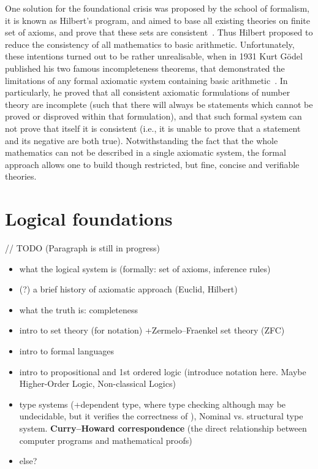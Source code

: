 \documentclass[article]{aaltoseries}
\begin{document}
One solution for the foundational crisis was proposed by the school of formalism, it is known as Hilbert's program, and aimed to base all existing theories on finite set of axioms, and prove that these sets are consistent~\cite{Zac06}. Thus Hilbert proposed to reduce the consistency of all mathematics to basic arithmetic. 
Unfortunately, these intentions turned out to be rather unrealisable, when in 1931 Kurt Gödel published his two famous incompleteness theorems, that demonstrated the limitations of any formal axiomatic system containing basic arithmetic~\cite{Raa15}. In particularly, he proved that all consistent axiomatic formulations of number theory are incomplete (such that there will always be statements which cannot be proved or disproved within that formulation), and that such formal system can not prove that itself it is consistent (i.e., it is unable to prove that a statement and its negative are both true).
Notwithstanding the fact that the whole mathematics can not be described in a single axiomatic system, the formal approach allows one to build though restricted, but fine, concise and verifiable theories.


\section{Logical foundations}
\label{sec:formal_theory}

// TODO (Paragraph is still in progress)

\begin{itemize}
\itemsep0em
	\item what the logical system is (formally: set of axioms, inference rules)
	\item (?) a brief history of axiomatic approach (Euclid, Hilbert)
	\item what the truth is: completeness
	\item intro to set theory (for notation) +Zermelo–Fraenkel set theory (ZFC)
	\item intro to formal languages
	\item intro to propositional and 1st ordered logic (introduce notation here. Maybe Higher-Order Logic, Non-classical Logics)
	\item type systems (+dependent type, where type checking although may be undecidable, but it verifies the correctness of ), Nominal vs. structural type system. \textbf{Curry–Howard correspondence} (the direct relationship between computer programs and mathematical proofs)
	\item else?
\end{itemize}
\end{document}
